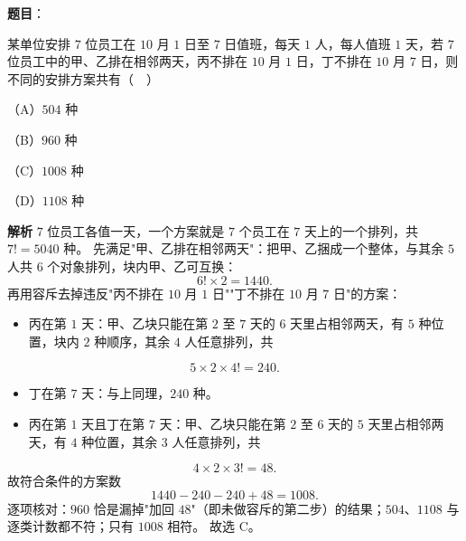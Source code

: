 \begin{answer}

\textbf{题目}：

某单位安排 $7$ 位员工在 $10$ 月 $1$ 日至 $7$ 日值班，每天 $1$ 人，每人值班 $1$ 天，若 $7$ 位员工中的甲、乙排在相邻两天，丙不排在 $10$ 月 $1$ 日，丁不排在 $10$ 月 $7$ 日，则不同的安排方案共有（　）

（A）$504$ 种

（B）$960$ 种

（C）$1008$ 种

（D）$1108$ 种

\textbf{解析}
$7$ 位员工各值一天，一个方案就是 $7$ 个员工在 $7$ 天上的一个排列，共 $7!=5040$ 种。
先满足"甲、乙排在相邻两天"：把甲、乙捆成一个整体，与其余 $5$ 人共 $6$ 个对象排列，块内甲、乙可互换：
\nopagebreak[4]
\[6!\times2=1440.\]
再用容斥去掉违反"丙不排在 $10$ 月 $1$ 日""丁不排在 $10$ 月 $7$ 日"的方案：
\begin{itemize}
\item 丙在第 $1$ 天：甲、乙块只能在第 $2$ 至 $7$ 天的 $6$ 天里占相邻两天，有 $5$ 种位置，块内 $2$ 种顺序，其余 $4$ 人任意排列，共
\end{itemize}
\nopagebreak[4]
\[5\times2\times4!=240.\]
\begin{itemize}
\item 丁在第 $7$ 天：与上同理，$240$ 种。
\item 丙在第 $1$ 天且丁在第 $7$ 天：甲、乙块只能在第 $2$ 至 $6$ 天的 $5$ 天里占相邻两天，有 $4$ 种位置，其余 $3$ 人任意排列，共
\end{itemize}
\nopagebreak[4]
\[4\times2\times3!=48.\]
故符合条件的方案数
\nopagebreak[4]
\[1440-240-240+48=1008.\]
逐项核对：$960$ 恰是漏掉"加回 $48$"（即未做容斥的第二步）的结果；$504$、$1108$ 与逐类计数都不符；只有 $1008$ 相符。
故选 C。


\end{answer}
